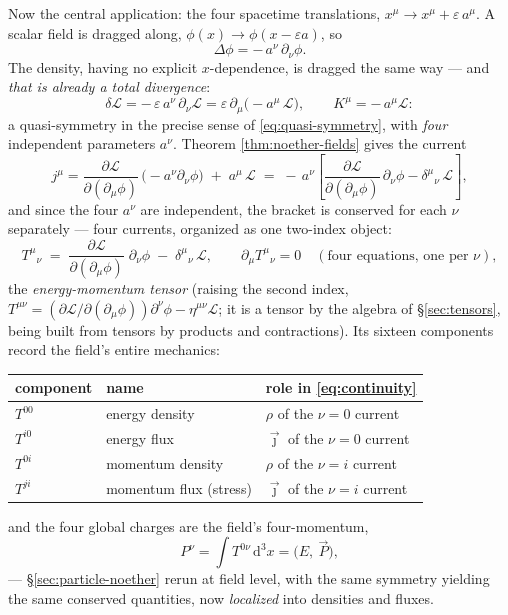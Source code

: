 \documentclass[11pt]{article}
\theoremstyle{plain}
\theoremstyle{definition}
\theoremstyle{remark}
\newcommand{\dd}{\mathrm{d}}
\newcommand{\pd}[2]{\frac{\partial #1}{\partial #2}}
\begin{document}
Now the central application: the four spacetime translations,
$x^\mu \to x^\mu + \varepsilon\,a^\mu$. A scalar field is dragged
along, $\phi(x) \to \phi(x - \varepsilon a)$, so
\begin{equation}
  \Delta\phi = -\,a^\nu\,\partial_\nu\phi .
\end{equation}
The density, having no explicit $x$-dependence, is dragged the same
way --- and \emph{that is already a total divergence}:
\begin{equation}
  \delta\mathcal L
  = -\,\varepsilon\, a^\nu\,\partial_\nu \mathcal L
  = \varepsilon\,\partial_\mu\bigl(-a^\mu\,\mathcal L\bigr),
  \qquad
  K^\mu = -\,a^\mu \mathcal L :
\end{equation}
a quasi-symmetry in the precise sense of \eqref{eq:quasi-symmetry},
with \emph{four} independent parameters $a^\nu$. Theorem
\ref{thm:noether-fields} gives the current
\begin{equation}
  j^\mu
  = \pd{\mathcal L}{(\partial_\mu\phi)}\,
    \bigl(-a^\nu\partial_\nu\phi\bigr)
    \;+\; a^\mu\,\mathcal L
  \;=\; -\,a^\nu \left[
    \pd{\mathcal L}{(\partial_\mu\phi)}\,\partial_\nu\phi
    - \delta^\mu{}_\nu\,\mathcal L
  \right],
\end{equation}
and since the four $a^\nu$ are independent, the bracket is conserved
for each $\nu$ separately --- four currents, organized as one
two-index object:
\begin{equation}
  \boxed{\;
  T^{\mu}{}_{\nu}
  \;=\;
  \pd{\mathcal L}{(\partial_\mu\phi)}\;\partial_\nu\phi
  \;-\; \delta^\mu{}_\nu\,\mathcal L,
  \qquad
  \partial_\mu T^{\mu}{}_{\nu} = 0
  \quad (\text{four equations, one per } \nu),
  \;}
  \label{eq:T-def}
\end{equation}
the \emph{energy-momentum tensor} (raising the second index,
$T^{\mu\nu} = (\partial\mathcal L/\partial(\partial_\mu\phi))
\partial^\nu\phi - \eta^{\mu\nu}\mathcal L$; it is a tensor by the
algebra of \S\ref{sec:tensors}, being built from tensors by products
and contractions). Its sixteen components record the field's entire
mechanics:
\begin{center}
\begin{tabular}{lll}
\toprule
component & name & role in \eqref{eq:continuity} \\
\midrule
$T^{00}$ & energy density & $\rho$ of the $\nu = 0$ current \\
$T^{i0}$ & energy flux & $\vec\jmath$ of the $\nu = 0$ current \\
$T^{0i}$ & momentum density & $\rho$ of the $\nu = i$ current \\
$T^{ji}$ & momentum flux (stress) & $\vec\jmath$ of the $\nu = i$ current \\
\bottomrule
\end{tabular}
\end{center}
and the four global charges are the field's four-momentum,
\begin{equation}
  P^\nu = \int T^{0\nu}\,\dd^3x
  = \bigl(E,\ \vec P\bigr),
\end{equation}
--- \S\ref{sec:particle-noether} rerun at field level, with the same
symmetry yielding the same conserved quantities, now \emph{localized}
into densities and fluxes.
\end{document}
